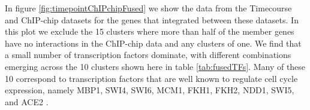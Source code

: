 \documentclass[]{article}
\begin{document}

In figure \ref{fig:timepointChIPchipFused} we show the data from the Timecourse and ChIP-chip datasets for the genes that integrated between these datasets. In this plot we exclude the 15 clusters where more than half of the member genes have no interactions in the ChIP-chip data and any clusters of one. We find that a small number of transcription factors dominate, with different combinations emerging across the 10 clusters shown here in table \ref{tab:fusedTFs}. Many of these 10 correspond to transcription factors that are well known to regulate cell cycle expression, namely MBP1, SWI4, SWI6, MCM1, FKH1, FKH2, NDD1, SWI5, and ACE2 \citep{simon2001serial}.
\end{document}
